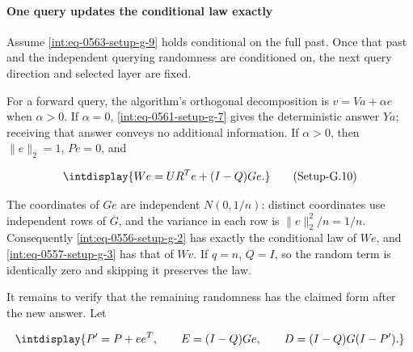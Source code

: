 \paragraph{One query updates the conditional law exactly}
\label{int:setup-sampler-4}
\mbox{}\par\smallskip


Assume \hyperref[int:eq-setup-g-9]{\eqref{int:eq-0563-setup-g-9}} holds conditional on the full past. Once that past and the independent querying randomness are conditioned on, the next query direction and selected layer are fixed.



For a forward query, the algorithm's orthogonal decomposition is \(v=Va+\alpha e\) when \(\alpha>0\). If \(\alpha=0\), \hyperref[int:eq-setup-g-7]{\eqref{int:eq-0561-setup-g-7}} gives the deterministic answer \(Ya\); receiving that answer conveys no additional information. If \(\alpha>0\), then \(\|e\|_2=1\), \(Pe=0\), and


\label{int:eq-setup-g-10}
\begingroup\renewcommand{\theHequation}{intdisplay.1065}
\begin{equation}
\intdisplay{
We=UR^T e+(I-Q)Ge.
}
\tag{Setup-G.10}
\label{int:eq-0564-setup-g-10}
\end{equation}
\endgroup


The coordinates of \(Ge\) are independent \(N(0,\allowbreak 1/n)\): distinct coordinates use independent rows of \(G\), and the variance in each row is \(\|e\|_2^2/n=1/n\). Consequently \hyperref[int:eq-setup-g-2]{\eqref{int:eq-0556-setup-g-2}} has exactly the conditional law of \(We\), and \hyperref[int:eq-setup-g-3]{\eqref{int:eq-0557-setup-g-3}} has that of \(Wv\). If \(q=n\), \(Q=I\), so the random term is identically zero and skipping it preserves the law.



It remains to verify that the remaining randomness has the claimed form after the new answer. Let


\begingroup\renewcommand{\theHequation}{intdisplay.1066}
\begin{equation*}
\intdisplay{
P'=P+ee^T,\qquad
 E=(I-Q)Ge,\qquad
 D=(I-Q)G(I-P').
}
\end{equation*}
\endgroup

